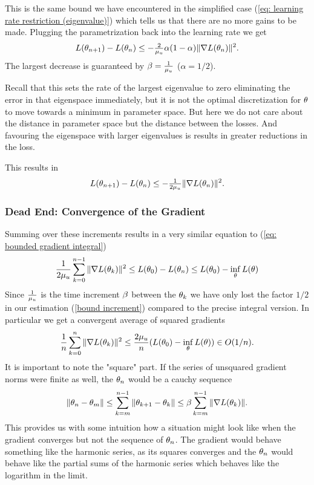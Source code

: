 %
This is the same bound we have encountered in the simplified case (\ref{eq:
learning rate restriction (eigenvalue)}) which tells us that there are no more
gains to be made. Plugging the parametrization back into the learning rate we
get
%
\begin{align*}
	L(\theta_{n+1}) - L(\theta_n)
	\le - \tfrac{2}{\mu_u}\alpha (1-\alpha)\|\nabla L(\theta_n)\|^2.
\end{align*}
%
The largest decrease is guaranteed by \(\beta=\tfrac{1}{\mu_u}\) (\(\alpha=1/2\)).
\begin{remark}
	Recall that this sets the rate of the largest eigenvalue to zero eliminating
	the error in that eigenspace immediately, but it is not the optimal
	discretization for \(\theta\) to move towards a minimum in parameter space.
	But here we do not care about the distance in parameter space but the
	distance between the losses. And favouring the eigenspace with larger
	eigenvalues is results in greater reductions in the loss.
\end{remark}
This results in
%
\begin{align*}
	L(\theta_{n+1}) - L(\theta_n)
	\le - \tfrac{1}{2\mu_u}\|\nabla L(\theta_n)\|^2.
\end{align*}
%
\subsubsection{Dead End: Convergence of the Gradient}

Summing over these increments results in a very similar equation to
(\ref{eq: bounded gradient integral})
%
\begin{align*}
	\frac{1}{2\mu_u} \sum_{k=0}^{n-1}\|\nabla L(\theta_k)\|^2
	\le L(\theta_0) - L(\theta_n)
	\le L(\theta_0) - \inf_{\theta} L(\theta)
\end{align*}
%
Since \(\tfrac{1}{\mu_u}\) is the time increment \(\beta\) between the \(\theta_k\)
we have only lost the factor \(1/2\) in our estimation (\ref{bound increment})
compared to the precise integral version.
In particular we get a convergent average of squared gradients
%
\begin{align*}
	\frac{1}{n} \sum_{k=0}^n \|\nabla L(\theta_k)\|^2
	\le \frac{2 \mu_u}{n} (L(\theta_0) - \inf_\theta L(\theta)) \in O(1/n).
\end{align*}
%
It is important to note the "square" part. If the series of unsquared gradient
norms were finite as well, the \(\theta_n\) would be a cauchy sequence
%
\begin{align*}
	\|\theta_n - \theta_m \|
	\le \sum_{k=m}^{n-1} \|\theta_{k+1} - \theta_k\|
	\le \beta \sum_{k=m}^{n-1} \|\nabla L(\theta_k)\|.
\end{align*}
%
This provides us with some intuition how a situation might look like when the
gradient converges but not the sequence of \(\theta_n\). The gradient would
behave something like the harmonic series, as its squares converges and the
\(\theta_n\) would behave like the partial sums of the harmonic series which
behaves like the logarithm in the limit.

